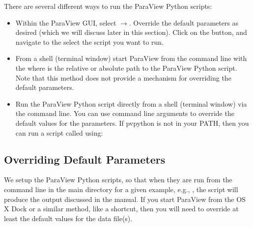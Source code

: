 There are several different ways to run the ParaView Python scripts:
\begin{itemize}
\item Within the ParaView GUI, select
  $\rightarrow$. Override the default
  parameters as desired (which we will discuss later in this
  section). Click on the  button, and navigate to the
  select the script you want to run.
\item From a shell (terminal window) start ParaView from the command
  line with the  where
   is the relative or absolute path to the ParaView
  Python script. Note that this method does not provide a mechanism
  for overriding the default parameters.
\item Run the ParaView Python script directly from a shell (terminal
  window) via the command line. You can use command line arguments to
  override the default values for the parameters. If pvpython is not
  in your PATH, then you can run a script called
   using:
\end{itemize}



\subsection{Overriding Default Parameters}

We setup the ParaView Python scripts, so that when they are run from
the command line in the main directory for a given example, e.g.,
, the script will produce the output
discussed in the manual. If you start ParaView from the OS X Dock or a
similar method, like a shortcut, then you will need to override at
least the default values for the data file(s).

